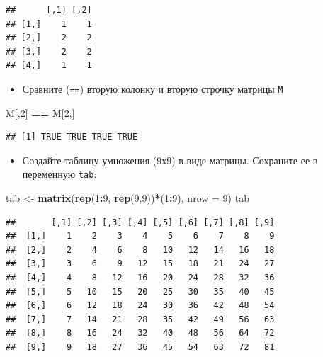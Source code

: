 \documentclass[]{book}
\newenvironment{Shaded}{\begin{snugshade}}{\end{snugshade}}
\newcommand{\DataTypeTok}[1]{\textcolor[rgb]{0.13,0.29,0.53}{#1}}
\newcommand{\DecValTok}[1]{\textcolor[rgb]{0.00,0.00,0.81}{#1}}
\newcommand{\KeywordTok}[1]{\textcolor[rgb]{0.13,0.29,0.53}{\textbf{#1}}}
\newcommand{\NormalTok}[1]{#1}
\newcommand{\OperatorTok}[1]{\textcolor[rgb]{0.81,0.36,0.00}{\textbf{#1}}}
\newcommand{\StringTok}[1]{\textcolor[rgb]{0.31,0.60,0.02}{#1}}
\providecommand{\tightlist}{%
  \setlength{\itemsep}{0pt}\setlength{\parskip}{0pt}}
\begin{document}
\begin{verbatim}
##      [,1] [,2]
## [1,]    1    1
## [2,]    2    2
## [3,]    2    2
## [4,]    1    1
\end{verbatim}

\begin{itemize}
\tightlist
\item
  Сравните (\texttt{==}) вторую колонку и вторую строчку матрицы \texttt{M}
\end{itemize}

\begin{Shaded}
\begin{Highlighting}[]
\NormalTok{M[,}\DecValTok{2}\NormalTok{] }\OperatorTok{==}\StringTok{ }\NormalTok{M[}\DecValTok{2}\NormalTok{,]}
\end{Highlighting}
\end{Shaded}

\begin{verbatim}
## [1] TRUE TRUE TRUE TRUE
\end{verbatim}

\begin{itemize}
\tightlist
\item
  Создайте таблицу умножения (9х9) в виде матрицы. Сохраните ее в переменную \texttt{tab}:
\end{itemize}

\begin{Shaded}
\begin{Highlighting}[]
\NormalTok{tab <-}\StringTok{ }\KeywordTok{matrix}\NormalTok{(}\KeywordTok{rep}\NormalTok{(}\DecValTok{1}\OperatorTok{:}\DecValTok{9}\NormalTok{, }\KeywordTok{rep}\NormalTok{(}\DecValTok{9}\NormalTok{,}\DecValTok{9}\NormalTok{))}\OperatorTok{*}\NormalTok{(}\DecValTok{1}\OperatorTok{:}\DecValTok{9}\NormalTok{), }\DataTypeTok{nrow =} \DecValTok{9}\NormalTok{)}
\NormalTok{tab}
\end{Highlighting}
\end{Shaded}

\begin{verbatim}
##       [,1] [,2] [,3] [,4] [,5] [,6] [,7] [,8] [,9]
##  [1,]    1    2    3    4    5    6    7    8    9
##  [2,]    2    4    6    8   10   12   14   16   18
##  [3,]    3    6    9   12   15   18   21   24   27
##  [4,]    4    8   12   16   20   24   28   32   36
##  [5,]    5   10   15   20   25   30   35   40   45
##  [6,]    6   12   18   24   30   36   42   48   54
##  [7,]    7   14   21   28   35   42   49   56   63
##  [8,]    8   16   24   32   40   48   56   64   72
##  [9,]    9   18   27   36   45   54   63   72   81
\end{verbatim}
\end{document}
